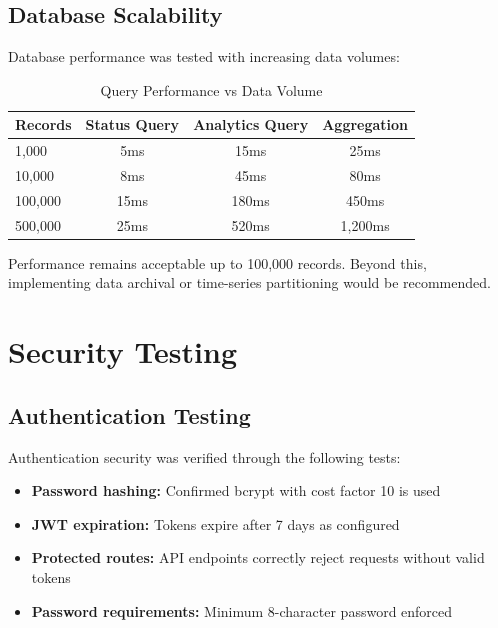\subsection{Database Scalability}

Database performance was tested with increasing data volumes:

\begin{table}[htbp]
    \centering
    \caption{Query Performance vs Data Volume}
    \label{tab:db-scalability}
    \begin{tabular}{lccc}
        \toprule
        \textbf{Records} & \textbf{Status Query} & \textbf{Analytics Query} & \textbf{Aggregation} \\
        \midrule
        1,000 & 5ms & 15ms & 25ms \\
        10,000 & 8ms & 45ms & 80ms \\
        100,000 & 15ms & 180ms & 450ms \\
        500,000 & 25ms & 520ms & 1,200ms \\
        \bottomrule
    \end{tabular}
\end{table}

Performance remains acceptable up to 100,000 records. Beyond this, implementing data archival or time-series partitioning would be recommended.

\section{Security Testing}

\subsection{Authentication Testing}

Authentication security was verified through the following tests:

\begin{itemize}
    \item \textbf{Password hashing:} Confirmed bcrypt with cost factor 10 is used
    \item \textbf{JWT expiration:} Tokens expire after 7 days as configured
    \item \textbf{Protected routes:} API endpoints correctly reject requests without valid tokens
    \item \textbf{Password requirements:} Minimum 8-character password enforced
\end{itemize}


